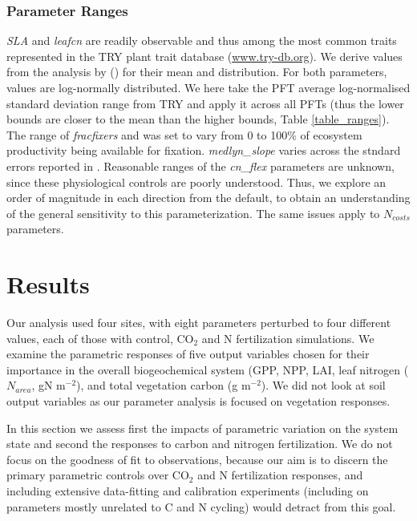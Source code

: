 \documentclass[draft,linenumbers]{agujournal}
\begin{document}
\subsubsection{Parameter Ranges}
\emph{SLA} and \emph{leafcn} are readily observable and thus among the most common traits represented in the TRY plant trait database (\url{www.try-db.org}). We derive values from the analysis by (\cite{kattge2011}) for their mean and distribution. For both parameters, values are log-normally distributed. We here take the PFT average log-normalised standard deviation range from TRY and apply it across all PFTs (thus the lower bounds are closer to the mean than the higher bounds, Table \ref{table_ranges}). The range of \emph{fracfixers} and was set to vary from 0 to 100\% of ecosystem productivity being available for fixation.  \emph{medlyn\_slope} varies across the stndard errors reported in \cite{dekauwe2015}. Reasonable ranges of the \emph{cn\_flex} parameters are unknown, since these physiological controls are poorly understood. Thus, we explore an order of magnitude in each direction from the default, to obtain an understanding of the general sensitivity to this parameterization. The same issues apply to $N_{costs}$ parameters. 

\section{Results}
Our analysis used four sites, with eight parameters perturbed to four different values, each of those with control, CO$_{2}$ and N fertilization simulations.  We examine the parametric responses of five output variables chosen for their importance in the overall biogeochemical system (GPP, NPP, LAI, leaf nitrogen  ($N_{area}$, gN m$^{-2}$), and total vegetation carbon (g m$^{-2}$). We did not look at soil output variables as our parameter analysis is focused on vegetation responses. 

In this section we assess first the impacts of parametric variation on the system state and second the responses to carbon and nitrogen fertilization. We do not focus on the goodness of fit to observations, because our aim is to discern the primary parametric controls over CO$_{2}$ and N fertilization responses, and including extensive data-fitting and calibration experiments (including on parameters mostly unrelated to C and N cycling) would detract from this goal. 
\end{document}
